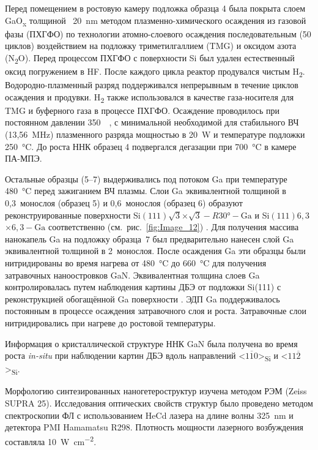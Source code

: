 Перед помещением в ростовую камеру подложка образца 4 была покрыта слоем
GaO\textsubscript{x} толщиной ~20~\si{\nano\meter} методом
плазменно-химического осаждения из газовой фазы (ПХГФО) по технологии
атомно-слоевого осаждения \cite{Altuntas2014, Ramachandran2014}
последовательным (50 циклов) воздействием на подложку триметилгаллием (TMG) и
оксидом азота (N\textsubscript{2}O). Перед процессом ПХГФО с поверхности Si был
удален естественный оксид погружением в HF. После каждого цикла реактор
продувался чистым H\textsubscript{2}. Водородно-плазменный разряд поддерживался
непрерывным в течение циклов осаждения и продувки. H\textsubscript{2} также
использовался в качестве газа-носителя для TMG и буферного газа в процессе
ПХГФО. Осаждение проводилось при постоянном давлении 350~\si{\milli\torr}, с
минимальной необходимой для стабильного ВЧ (13,56~\si{\mega\hertz}) плазменного
разряда мощностью в 20~\si{\watt} и температуре подложки
250~\si{\degreeCelsius}. До роста ННК образец 4 подвергался дегазации при
700~\si{\degreeCelsius} в камере ПА-МПЭ.

Остальные образцы (5--7) выдерживались под потоком Ga при температуре
480~\si{\degreeCelsius} перед зажиганием ВЧ плазмы. Слои Ga эквивалентной
толщиной в 0,3~монослоя (образец 5) и 0,6~монослоя (образец 6) образуют
реконструированные поверхности  Si\((111)\sqrt{3}\)\(\times\)\(\sqrt{3} -
R30\si{\degree} - \text{Ga}\) и Si\((111)6,3\)\(\times\)\(6,3 - \text{Ga}\)
соответственно (см.~рис.~\cref{fig:Image_12}) \cite{Park1988}. Для получения
массива нанокапель Ga на подложку образца~7 был предварительно нанесен слой Ga
эквивалентной толщиной в 2~монослоя. После осаждения Ga эти образцы были
нитридированы во время нагрева от 480~\si{\degreeCelsius} до
660~\si{\degreeCelsius} для получения затравочных наноостровков GaN.
Эквивалентная толщина слоев Ga контролировалась путем наблюдения картины ДБЭ от
подложки Si(111) с реконструкцией обогащённой Ga поверхности
\cite{Fedorov2018}. ЭДП Ga поддерживалось постоянным в процессе осаждения
затравочного слоя и роста. Затравочные слои нитридировались при нагреве до
ростовой температуры.

Информация о кристаллической структуре ННК GaN была получена во время роста
\textit{in-situ} при наблюдении картин ДБЭ вдоль направлений
<\(1\overline{1}0\)>\textsubscript{Si} и
<\(11\overline{2}\)>\textsubscript{Si}.

Морфологию синтезированных наногетероструктур изучена методом РЭМ (Zeiss SUPRA
25). Исследования оптических свойств структур было проведено методом
спектроскопии ФЛ с использованием HeCd лазера на длине волны
325~\si{\nano\meter} и детектора PMI Hamamatsu R298. Плотность мощности
лазерного возбуждения составляла 10~\si{\watt\per\centi\meter\squared}.

